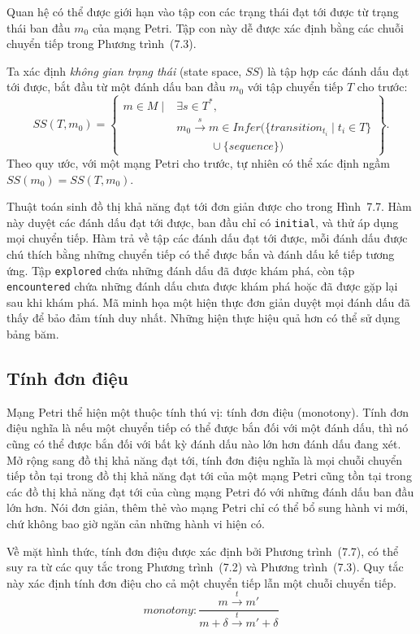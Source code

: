 Quan hệ có thể được giới hạn vào tập con các trạng thái đạt tới được từ trạng thái ban đầu $m_0$ của mạng Petri. Tập con này dễ được xác định bằng các chuỗi chuyển tiếp trong Phương trình~(7.3).

Ta xác định \emph{không gian trạng thái} (state space, $SS$) là tập hợp các đánh dấu đạt tới được, bắt đầu từ một đánh dấu ban đầu $m_0$ với tập chuyển tiếp $T$ cho trước:
\begin{equation}
SS(T,m_0)=\left\{\begin{aligned}
m\in M\mid{}&\exists s\in T^*,\\
&m_0\xrightarrow{s}m\in Infer(\{transition_{t_i}\mid t_i\in T\}\\
&\qquad\quad\cup\{sequence\})
\end{aligned}\right\}.\tag{7.6}
\end{equation}
Theo quy ước, với một mạng Petri cho trước, tự nhiên có thể xác định ngầm $SS(m_0)=SS(T,m_0)$.

Thuật toán sinh đồ thị khả năng đạt tới đơn giản được cho trong Hình~7.7. Hàm này duyệt các đánh dấu đạt tới được, ban đầu chỉ có \texttt{initial}, và thử áp dụng mọi chuyển tiếp. Hàm trả về tập các đánh dấu đạt tới được, mỗi đánh dấu được chú thích bằng những chuyển tiếp có thể được bắn và đánh dấu kế tiếp tương ứng. Tập \texttt{explored} chứa những đánh dấu đã được khám phá, còn tập \texttt{encountered} chứa những đánh dấu chưa được khám phá hoặc đã được gặp lại sau khi khám phá. Mã minh họa một hiện thực đơn giản duyệt mọi đánh dấu đã thấy để bảo đảm tính duy nhất. Những hiện thực hiệu quả hơn có thể sử dụng bảng băm.

\subsection{Tính đơn điệu}
Mạng Petri thể hiện một thuộc tính thú vị: tính đơn điệu (monotony). Tính đơn điệu nghĩa là nếu một chuyển tiếp có thể được bắn đối với một đánh dấu, thì nó cũng có thể được bắn đối với bất kỳ đánh dấu nào lớn hơn đánh dấu đang xét. Mở rộng sang đồ thị khả năng đạt tới, tính đơn điệu nghĩa là mọi chuỗi chuyển tiếp tồn tại trong đồ thị khả năng đạt tới của một mạng Petri cũng tồn tại trong các đồ thị khả năng đạt tới của cùng mạng Petri đó với những đánh dấu ban đầu lớn hơn. Nói đơn giản, thêm thẻ vào mạng Petri chỉ có thể bổ sung hành vi mới, chứ không bao giờ ngăn cản những hành vi hiện có.

Về mặt hình thức, tính đơn điệu được xác định bởi Phương trình~(7.7), có thể suy ra từ các quy tắc trong Phương trình~(7.2) và Phương trình~(7.3). Quy tắc này xác định tính đơn điệu cho cả một chuyển tiếp lẫn một chuỗi chuyển tiếp.
\begin{equation}
monotony:\frac{m\xrightarrow{t}m'}{m+\delta\xrightarrow{t}m'+\delta}\tag{7.7}
\end{equation}

